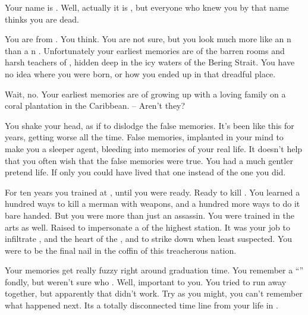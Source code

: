 \documentclass[char]{NeptuneBall}
\begin{document}
\name{\cQueen{}}


Your name is \cQueen{\MYname}. Well, actually it is \cQueen{\King} \cQueen{}, but everyone who knew you by that name thinks you are dead.

You are from \pAtlantis{}. You think. You are not sure, but you look much more like an \pAtlantis{}n than a \pPacifica{}n \cQueen{\mer{}}. Unfortunately your earliest memories are of the barren rooms and harsh teachers of \pAssassin{}, hidden deep in the icy waters of the Bering Strait. You have no idea where you were born, or how you ended up in that dreadful place. 

Wait, no. Your earliest memories are of growing up with a loving family on a coral plantation in the Caribbean. -- Aren't they?

You shake your head, as if to dislodge the false memories. It's been like this for years, getting worse all the time. False memories, implanted in your mind to make you a sleeper agent, bleeding into memories of your real life. It doesn't help that you often wish that the false memories were true. You had a much gentler pretend life. If only you could have lived that one instead of the one you did.

For ten years you trained at \pAssassin{}, until you were ready. Ready to kill \cKing{\King} \cKing{}. You learned a hundred ways to kill a merman with weapons, and a hundred more ways to do it bare handed. But you were more than just an assassin. You were trained in the arts as well. Raised to impersonate a \cAthena{\mer} of the highest station. It was your job to infiltrate \pAtlantis{}, and the heart of the \cKing{\King}, and to strike \cKing{\them} down when \pAtlantis{} least suspected. You were to be the final nail in the coffin of this treacherous nation.

Your memories get really fuzzy right around graduation time.  You remember a ``\cDiplomat{}'' fondly, but weren't sure who \cDiplomat{\they} \cDiplomat{\are}. Well, \cDiplomat{\they} \cDiplomat{\were} important to you. You tried to run away together, but apparently that didn't work. Try as you might, you can't remember what happened next. Its a totally disconnected time line from your life in \pAtlantis{}.
\end{document}
